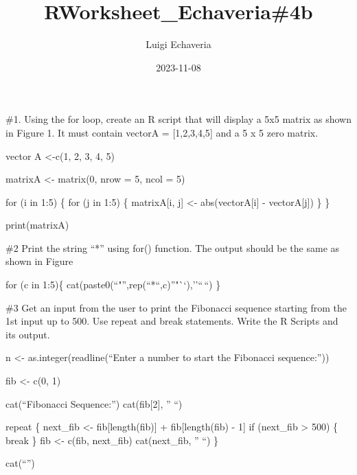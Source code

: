 \documentclass[
]{article}
\title{RWorksheet\_Echaveria\#4b}
\author{Luigi Echaveria}
\date{2023-11-08}
\begin{document}
\maketitle

\#1. Using the for loop, create an R script that will display a 5x5
matrix as shown in Figure 1. It must contain vectorA = {[}1,2,3,4,5{]}
and a 5 x 5 zero matrix.

vector A \textless-c(1, 2, 3, 4, 5)

matrixA \textless- matrix(0, nrow = 5, ncol = 5)

for (i in 1:5) \{ for (j in 1:5) \{ matrixA{[}i, j{]} \textless-
abs(vectorA{[}i{]} - vectorA{[}j{]}) \} \}

print(matrixA)

\#2 Print the string ``*'' using for() function. The output should be
the same as shown in Figure

for (c in 1:5)\{ cat(paste0(``"'',rep(``*``,c)''"``),''\n``\,``) \}

\#3 Get an input from the user to print the Fibonacci sequence starting
from the 1st input up to 500. Use repeat and break statements. Write the
R Scripts and its output.

n \textless- as.integer(readline(``Enter a number to start the Fibonacci
sequence:''))

fib \textless- c(0, 1)

cat(``Fibonacci Sequence:\n'') cat(fib{[}2{]}, '' ``)

repeat \{ next\_fib \textless- fib{[}length(fib){]} + fib{[}length(fib)
- 1{]} if (next\_fib \textgreater{} 500) \{ break \} fib \textless-
c(fib, next\_fib) cat(next\_fib, '' ``) \}

cat(``\n'')
\end{document}
